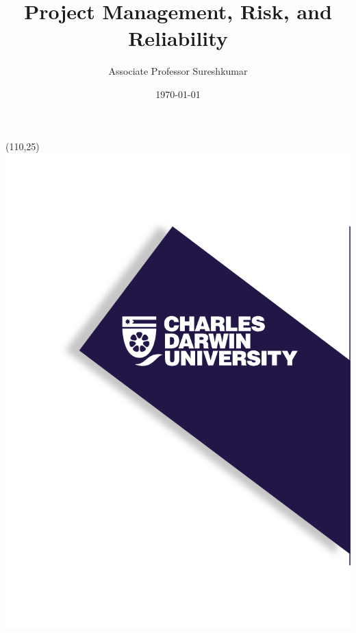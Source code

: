 \documentclass[aspectratio=169]{beamer}
\title[PRT551 - Lecture 3]{Project Management, Risk, and Reliability} %
\author{Associate Professor Sureshkumar} %
\institute[CDU] %
{
Charles Darwin University \\ %
\medskip
\textit{cdux@cdu.edu.au} %
}
\date{\today} %
\begin{document}
\begin{frame}
\titlepage %
\begin{textblock}{20}(110,25)
      \includegraphics[scale=0.8]{logo_1.png}
\end{textblock}
\end{frame}



\end{document}

